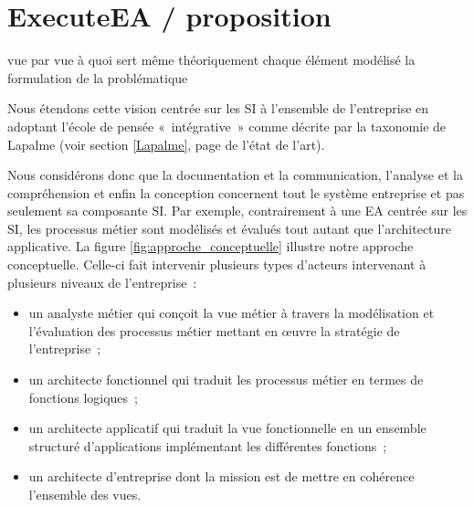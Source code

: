 \section{ExecuteEA / proposition}

vue par vue à quoi sert même théoriquement
chaque élément modélisé la formulation de la problématique


Nous étendons
cette vision centrée sur les SI à l'ensemble de l'entreprise en adoptant l'école
de pensée «~intégrative~» comme décrite par la taxonomie de Lapalme (voir
section \ref{Lapalme}, page \pageref{Lapalme} de l'état de l'art).

Nous considérons donc que la documentation et la communication, l'analyse et la
compréhension et enfin la conception concernent tout le système entreprise et
pas seulement sa composante SI. Par exemple, contrairement à une EA centrée sur
les SI, les processus métier sont modélisés et évalués tout autant que
l'architecture applicative. La figure \ref{fig:approche_conceptuelle} illustre
notre approche conceptuelle. Celle-ci fait intervenir plusieurs types d'acteurs
intervenant à plusieurs niveaux de l'entreprise~: \begin{itemize} \item un
analyste métier qui conçoit la vue métier à travers la modélisation et
l'évaluation des processus métier mettant en œuvre la stratégie de
l'entreprise~; \item un architecte fonctionnel qui traduit les processus métier
en termes de fonctions logiques~; \item un architecte applicatif qui traduit la
vue fonctionnelle en un ensemble structuré d'applications implémentant les
différentes fonctions~; \item un architecte d'entreprise dont la mission est de
mettre en cohérence l'ensemble des vues. \end{itemize}

